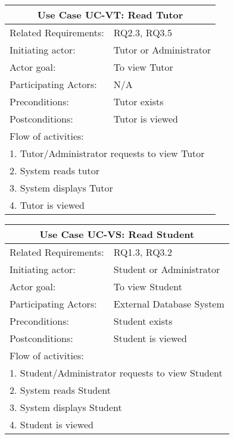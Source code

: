 \documentclass[12pt]{article}
\begin{document}
{		
		\begin{tabular}{| l | p{10cm}| }
			\hline\multicolumn{2}{|c|}{ \textbf{Use Case UC-VT: Read Tutor}} \\ \hline
			Related Requirements: & RQ2.3, RQ3.5 \\ \hline
			Initiating actor: & Tutor or Administrator \\ \hline
			Actor goal: & To view Tutor\\ \hline
			Participating Actors: & N/A\\ \hline
			Preconditions:& Tutor exists\\ \hline
			Postconditions: & Tutor is viewed\\ \hline
			\multicolumn{2}{|l|}{Flow of activities:}\\ \hline
			\multicolumn{2}{|p{15cm}|}{1. Tutor/Administrator requests to view Tutor}\\
			\multicolumn{2}{|p{15cm}|}{2. System reads tutor}\\
			\multicolumn{2}{|p{15cm}|}{3. System displays Tutor}\\
			\multicolumn{2}{|l|}{4. Tutor is viewed}	
			\\ \hline		
		\end{tabular}	



		
		\begin{tabular}{| l | p{10cm}| }
			\hline\multicolumn{2}{|c|}{ \textbf{Use Case UC-VS: Read Student}} \\ \hline
			Related Requirements: & RQ1.3, RQ3.2 \\ \hline
			Initiating actor: & Student or Administrator \\ \hline
			Actor goal: & To view Student\\ \hline
			Participating Actors: & External Database System\\ \hline
			Preconditions: &Student exists\\ \hline
			Postconditions: & Student is viewed\\ \hline
			\multicolumn{2}{|l|}{Flow of activities:}\\ \hline
			\multicolumn{2}{|p{15cm}|}{1. Student/Administrator requests to view Student}\\
			\multicolumn{2}{|p{15cm}|}{2. System reads Student}\\ 
			\multicolumn{2}{|p{15cm}|}{3. System displays Student}\\
			\multicolumn{2}{|l|}{4. Student is viewed}	
			\\ \hline		
		\end{tabular}	

}
\end{document}
